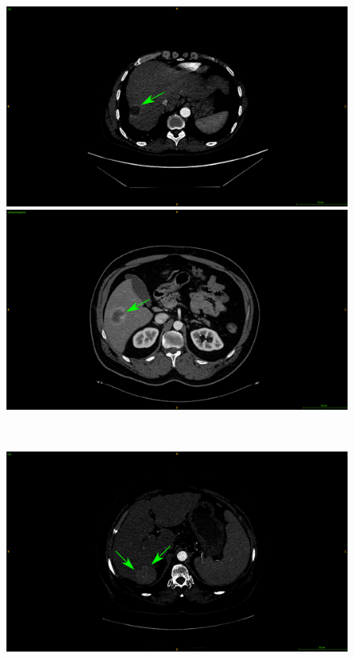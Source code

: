 \documentclass[]{article}
\begin{document}
\begin{figure}[!ht]
	\centering
	\begin{minipage}{0.45\linewidth}
		\includegraphics[width=\linewidth]{../Contributions/images/ImagingTraits/ResizeGDB_peritumoralEnhancement}
	\end{minipage} \hspace{-0.1cm}
	\begin{minipage}{0.45\linewidth}
		\includegraphics[width=\linewidth]{../Contributions/images/ImagingTraits/ResizeTCIA_peritumoralEnhancement}
	\end{minipage} \\
	\begin{minipage}{0.45\linewidth}
		\includegraphics[width=\linewidth]{../Contributions/images/ImagingTraits/ResizeGDB_smoothMargins}

\end{minipage}
\end{figure}
\end{document}
